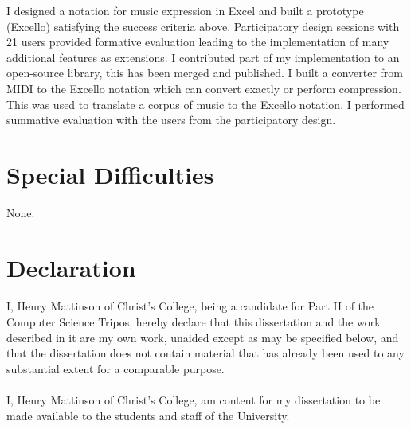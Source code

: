 I designed a notation for music expression in Excel and built a prototype (Excello) satisfying the success criteria above. Participatory design sessions with 21 users provided formative evaluation leading to the implementation of many additional features as extensions. I contributed part of my implementation to an open-source library, this has been merged and published. I built a converter from MIDI to the Excello notation which can convert exactly or perform compression. This was used to translate a corpus of music to the Excello notation. I performed summative evaluation with the users from the participatory design.

\section*{Special Difficulties}

None.

\newpage
\section*{Declaration}

\paragraph{} I, Henry Mattinson of Christ's College, being a candidate for Part II of the Computer Science Tripos,
hereby declare that this dissertation and the work described in it
are my own work, unaided except as may be specified below, and
that the dissertation does not contain material that has already
been used to any substantial extent for a comparable purpose.

\paragraph{} I, Henry Mattinson of Christ's College,
am content for my dissertation to be made available to the students and staff of the University.

\bigskip
{}

\medskip
{}

\tableofcontents



